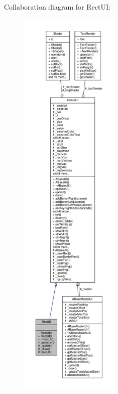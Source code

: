 Collaboration diagram for Rect\+UI\+:
\nopagebreak
\begin{figure}[H]
\begin{center}
\leavevmode
\includegraphics[height=550pt]{class_rect_u_i__coll__graph}
\end{center}
\end{figure}
